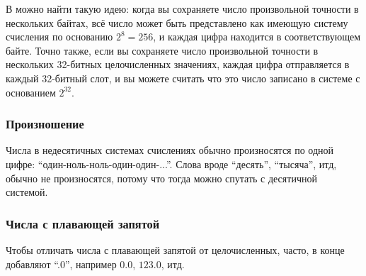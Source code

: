 В  можно найти такую идею: когда вы сохраняете число произвольной точности в нескольких байтах,
всё число может быть представлено как имеющую систему счисления по основанию $2^8=256$, и каждая цифра находится
в соответствующем байте.
Точно также, если вы сохраняете число произвольной точности в нескольких 32-битных целочисленных значениях,
каждая цифра отправляется в каждый 32-битный слот, и вы можете считать что это число записано в системе с основанием $2^{32}$.

\subsubsection{Произношение}

Числа в недесятичных системах счислениях обычно произносятся по одной цифре: ``один-ноль-ноль-один-один-...''.
Слова вроде ``десять'', ``тысяча'', итд, обычно не произносятся, потому что тогда можно спутать с десятичной системой.

\subsubsection{Числа с плавающей запятой}

Чтобы отличать числа с плавающей запятой от целочисленных, часто, в конце добавляют ``.0'',
например $0.0$, $123.0$, итд.

